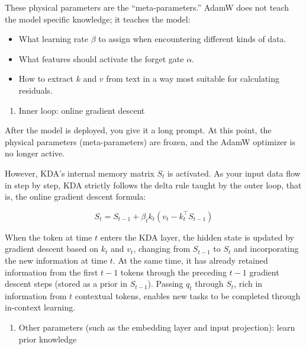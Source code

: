 These physical parameters are the ``meta-parameters.'' AdamW does not teach the model specific knowledge; it teaches the model:

\begin{itemize}
\tightlist
\item
  What learning rate \(\beta\) to assign when encountering different kinds of data.
\item
  What features should activate the forget gate \(\alpha\).
\item
  How to extract \(k\) and \(v\) from text in a way most suitable for calculating residuals.
\end{itemize}

\begin{enumerate}
\def\labelenumi{\arabic{enumi}.}
\setcounter{enumi}{1}
\tightlist
\item
  Inner loop: online gradient descent
\end{enumerate}

After the model is deployed, you give it a long prompt. At this point, the physical parameters (meta-parameters) are frozen, and the AdamW optimizer is no longer active.

However, KDA's internal memory matrix \(S_t\) is activated. As your input data flow in step by step, KDA strictly follows the delta rule taught by the outer loop, that is, the online gradient descent formula:

\[
S_t=S_{t-1}+\beta_tk_t\left(v_t-k_t^\top S_{t-1}\right)
\]

When the token at time \(t\) enters the KDA layer, the hidden state is updated by gradient descent based on \(k_t\) and \(v_t\), changing from \(S_{t-1}\) to \(S_t\) and incorporating the new information at time \(t\). At the same time, it has already retained information from the first \(t-1\) tokens through the preceding \(t-1\) gradient descent steps (stored as a prior in \(S_{t-1}\)). Passing \(q_t\) through \(S_t\), rich in information from \(t\) contextual tokens, enables new tasks to be completed through in-context learning.

\begin{enumerate}
\def\labelenumi{\arabic{enumi}.}
\setcounter{enumi}{2}
\tightlist
\item
  Other parameters (such as the embedding layer and input projection): learn prior knowledge
\end{enumerate}


